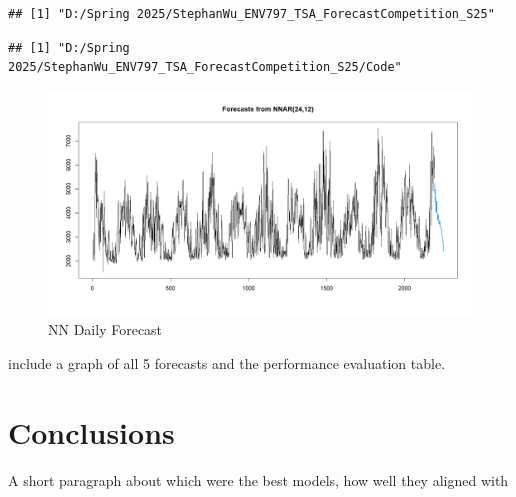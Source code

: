 \documentclass[
]{article}
\begin{document}
\begin{verbatim}
## [1] "D:/Spring 2025/StephanWu_ENV797_TSA_ForecastCompetition_S25"
\end{verbatim}

\begin{verbatim}
## [1] "D:/Spring 2025/StephanWu_ENV797_TSA_ForecastCompetition_S25/Code"
\end{verbatim}

\begin{figure}
\centering
\includegraphics{./Forecasts/NN_daily_113.png}
\caption{NN Daily Forecast}
\end{figure}

include a graph of all 5 forecasts and the performance evaluation table.

\section{Conclusions}\label{conclusions}

A short paragraph about which were the best models, how well they
aligned with
\end{document}
